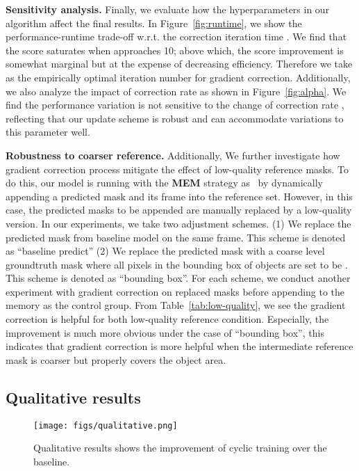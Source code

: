 \documentclass{article}
\begin{document}
\textbf{Sensitivity analysis.} Finally, we evaluate how the hyperparameters in our algorithm affect the final results. In Figure~\ref{fig:runtime}, we show the performance-runtime trade-off w.r.t. the correction iteration time . We find that the  score saturates 
when  approaches 10; above which, the score improvement is somewhat marginal but at the expense of decreasing efficiency. Therefore we take  as the empirically optimal iteration number for gradient correction. Additionally, we also analyze the impact of correction rate  as shown in Figure~\ref{fig:alpha}. We find the performance variation is not sensitive to the change of correction rate , reflecting that our update scheme is robust and can accommodate variations to this parameter well.

\textbf{Robustness to coarser reference.} Additionally, We further investigate how gradient correction process mitigate the effect of low-quality reference masks. To do this, our model is running with the \textbf{MEM} strategy as~\cite{Oh_2019_ICCV} by dynamically appending a predicted mask and its frame into the reference set. However, in this case, the predicted masks to be appended are manually replaced by a low-quality version. In our experiments, we take two adjustment schemes. (1) We replace the predicted mask  from baseline model on the same frame. This scheme is denoted as ``baseline predict'' (2) We replace the predicted mask  with a coarse level groundtruth mask where all pixels in the bounding box of objects are set to be . This scheme is denoted as ``bounding box''. For each scheme, we conduct another experiment with gradient correction on replaced masks before appending to the memory as the control group. From Table~\ref{tab:low-quality}, we see the gradient correction is helpful for both low-quality reference condition. Especially, the improvement is much more obvious under the case of ``bounding box'', this indicates that gradient correction is more helpful when the intermediate reference mask is coarser but properly covers the object area.

\subsection{Qualitative results}
\begin{figure}
    \centering
    \texttt{[image: figs/qualitative.png]}
    \caption{Qualitative results shows the improvement of cyclic training over the baseline.}
    \label{fig:vis}
    \vspace{-4mm}
\end{figure}
\end{document}
